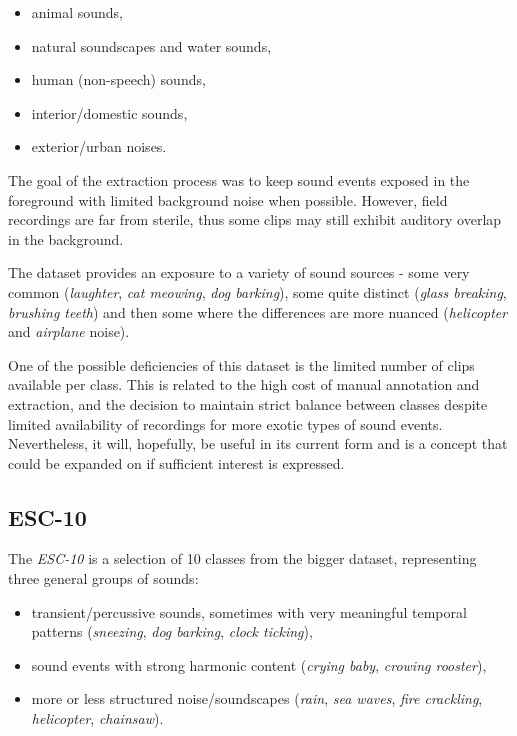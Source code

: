 \documentclass[letterpaper]{sig-alternate}
\begin{document}
\begin{itemize}[noitemsep,topsep=0pt]
\itemsep0em
\item animal sounds,
\item natural soundscapes and water sounds,
\item human (non-speech) sounds,
\item interior/domestic sounds,
\item exterior/urban noises.
\end{itemize}

The goal of the extraction process was to keep sound events exposed in the foreground with limited background noise when possible. However, field recordings are far from sterile, thus some clips may still exhibit auditory overlap in the background.

The dataset provides an exposure to a variety of sound sources - some very common (\textit{laughter}, \textit{cat meowing}, \textit{dog barking}), some quite distinct (\textit{glass breaking}, \textit{brushing teeth}) and then some where the differences are more nuanced (\textit{helicopter} and \textit{airplane} noise).

One of the possible deficiencies of this dataset is the limited number of clips available per class. This is related to the high cost of manual annotation and extraction, and the decision to maintain strict balance between classes despite limited availability of recordings for more exotic types of sound events. Nevertheless, it will, hopefully, be useful in its current form and is a concept that could be expanded on if sufficient interest is expressed.

\subsection{ESC-10}

The \textit{ESC-10} is a selection of 10 classes from the bigger dataset, representing three general groups of sounds:

\begin{itemize}[noitemsep,topsep=0pt]
\item transient/percussive sounds, sometimes with very meaningful temporal patterns (\textit{sneezing}, \textit{dog barking}, \textit{clock ticking}),
\item sound events with strong harmonic content (\textit{crying baby}, \textit{crowing rooster}),
\item more or less structured noise/soundscapes (\textit{rain}, \textit{sea waves}, \textit{fire crackling}, \textit{helicopter}, \textit{chainsaw}).
\end{itemize}
\end{document}
